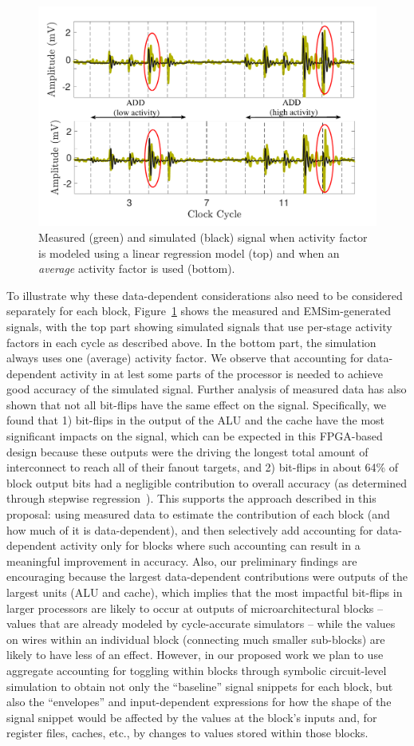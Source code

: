 \begin{figure}
	\centering
\vspace{-0.2in}
	\includegraphics[width=0.45\columnwidth]{figure/alpha2.pdf}
\vspace{-0.3in}
	\caption{Measured (green) and simulated (black) signal when activity factor is modeled using a linear regression model (top) and when an \textit{average} activity factor is used (bottom).}
	\label{fig:alpha}
\end{figure}
To illustrate why these data-dependent considerations also need to be considered separately for each block, Figure~\ref{fig:alpha} shows the measured and EMSim-generated signals, with the top part showing simulated signals that use per-stage activity factors in each cycle as described above. In the bottom part, the simulation always uses one (average) activity factor. We observe that accounting for data-dependent activity in at lest some parts of the processor is needed to achieve good accuracy of the simulated signal. Further analysis of measured data has also shown that not all bit-flips have the same effect on the signal. Specifically, we found that 1) bit-flips in the output of the ALU and the cache have the most significant impacts on the signal, which can be expected in this FPGA-based design because these outputs were the driving the longest total amount of interconnect to reach all of their fanout targets, and 2) bit-flips in about 64\% of block output bits had a negligible contribution to overall accuracy (as determined through stepwise regression~\cite{f-test}). This supports the approach described in this proposal: using measured data to estimate the contribution of each block (and how much of it is data-dependent), and then selectively add accounting for data-dependent activity only for blocks where such accounting can result in a meaningful improvement in accuracy. Also, our preliminary findings are encouraging because the largest data-dependent contributions were outputs of the largest units (ALU and cache), which implies that the most impactful bit-flips in larger processors are likely to occur at outputs of microarchitectural blocks -- values that are already modeled by cycle-accurate simulators -- while the values on wires within an individual block (connecting much smaller sub-blocks) are likely to have less of an effect. However, in our proposed work we plan to use aggregate accounting for toggling within blocks through symbolic circuit-level simulation to obtain not only the ``baseline'' signal snippets for each block, but also the ``envelopes'' and input-dependent expressions for how the shape of the signal snippet would be affected by the values at the block's inputs and, for register files, caches, etc., by changes to values stored within those blocks.

